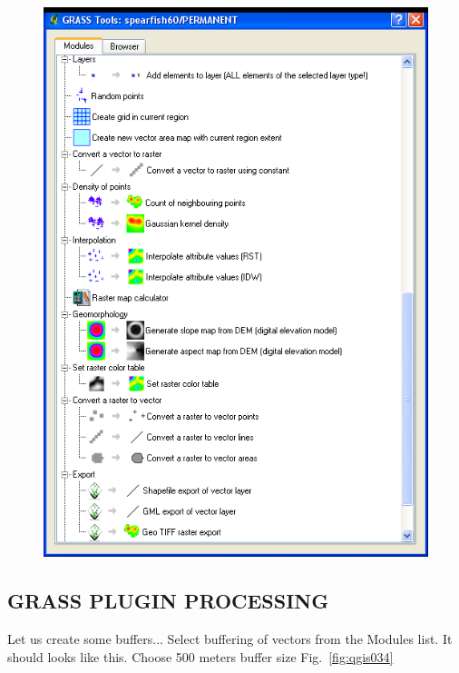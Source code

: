 \begin{figure}[htbp]
   \centering
   \includegraphics[scale=0.4]{qgis033.png}
   \caption{}
   \label{fig:qgis033}
\end{figure}

\subsection{GRASS PLUGIN PROCESSING}

Let us create some buffers... Select buffering of vectors from the
Modules list. It should looks like this. Choose 500 meters buffer
size Fig.~\ref{fig:qgis034}

